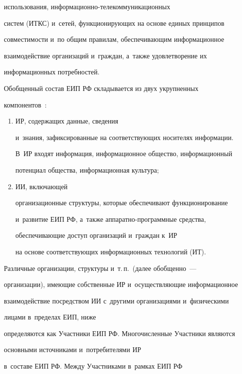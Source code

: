 использования, ин\-фор\-ма\-ци\-он\-но-те\-ле\-ком\-му\-ни\-ка\-ци\-он\-ных

сис\-тем (ИТКС) и~сетей, функционирующих на основе единых принципов

совместимости и~по общим правилам, обеспечивающим информационное

взаимодействие организаций и~граждан, а~также удовлетворение их

информационных потребностей.



     Обобщенный состав ЕИП РФ складывается из двух укрупненных

компонентов~\cite{1-zk}:

     \begin{enumerate}[(1)]

     \item ИР, содержащих данные, сведения

и~знания, зафиксированные на соответствующих носителях информации.

В~ИР входят информация, информационное общество, информационный

потенциал общества, информационная культура;

     \item ИИ, включающей

организационные структуры, которые обеспечивают функционирование

и~развитие ЕИП РФ, а~так\-же ап\-па\-рат\-но-про\-грам\-мные средства,

обеспечивающие доступ организаций и~граждан к~ИР

на основе соответствующих информационных технологий (ИТ).

     \end{enumerate}



     Различные организации, структуры и~т.\,п.\ (далее обобщенно~---

организации), имеющие собственные ИР и~осуществляющие информационное

взаимодействие посредством ИИ с~другими организациями и~физическими

лицами в~пределах ЕИП, ниже

определяются как Участники ЕИП РФ. Многочисленные Участники являются

основными источниками и~потребителями ИР

     в~со\-ста\-ве ЕИП РФ. Между Участниками в~рамках ЕИП РФ

